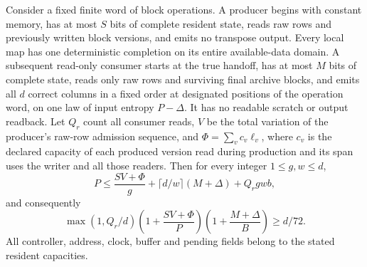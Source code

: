 \begin{lemma}\label{lem:feedback-product}
Consider a fixed finite word of block operations. A producer begins with
constant memory, has at most $S$ bits of complete resident state, reads
raw rows and previously written block versions, and emits no transpose
output. Every local map has one deterministic completion on its entire
available-data domain. A subsequent read-only consumer starts at the true
handoff, has at most $M$ bits of complete state, reads only raw rows and
surviving final archive blocks, and emits all $d$ correct columns in a fixed
order at designated positions of the operation word, on one law of input
entropy $P-\Delta$. It has no readable scratch
or output readback. Let $Q_r$ count all consumer reads, $V$ be the total
variation of the producer's raw-row admission sequence, and
$\Phi=\sum_v c_v\ell_v$, where $c_v$ is the declared capacity of each
produced version read during production and its span uses the writer and
all those readers. Then for every integer $1\le g,w\le d$,
\[
 P\le\frac{SV+\Phi}{g}+\lceil d/w\rceil(M+\Delta)+Q_r gwb,
\]
and consequently
\[
 \max(1,Q_r/d)\left(1+\frac{SV+\Phi}{P}\right)
              \left(1+\frac{M+\Delta}{B}\right)\ge d/72.
\]
All controller, address, clock, buffer and pending fields belong to the
stated resident capacities.
\end{lemma}
